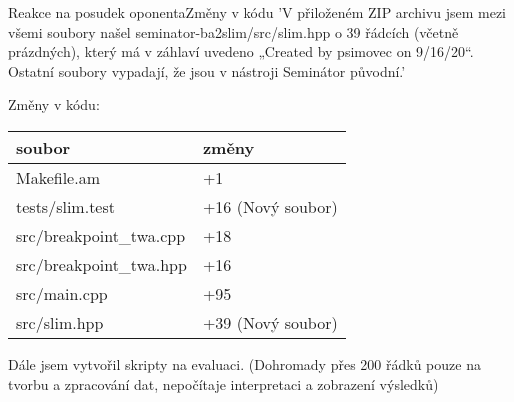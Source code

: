 \documentclass[
]{beamer}
\newcommand{\hlineny}{\hline}
\begin{document}
	\begin{frame}{Reakce na posudek oponenta}{Změny v kódu}
		'V přiloženém ZIP archivu jsem mezi všemi soubory našel seminator-ba2slim/src/slim.hpp o 39 řádcích (včetně prázdných),  který má v záhlaví uvedeno  „Created by psimovec on 9/16/20“.  Ostatní soubory vypadají, že jsou v nástroji Seminátor původní.'
		
		
		Změny v kódu:
		
	\begin{table}[ht]
		\centering
		
		
		
		\begin{tabular}{|l|l|}
			\hline
			soubor  &   změny \\
			\hline
			\hline
			Makefile.am & +1\\
			\hlineny
			tests/slim.test          &       +16 (Nový soubor)\\
			
			\hline
			src/breakpoint\_twa.cpp    &     +18 \\
			\hline
			src/breakpoint\_twa.hpp      &        +16 \\
			\hlineny
			src/main.cpp&  	+95\\\hlineny
			src/slim.hpp&+39 (Nový soubor)\\\hline
			
		\end{tabular}
	\end{table}
		
					
		Dále jsem vytvořil skripty na evaluaci. (Dohromady přes 200 řádků pouze na tvorbu a zpracování dat, nepočítaje interpretaci a zobrazení výsledků)
	\end{frame}
\end{document}
